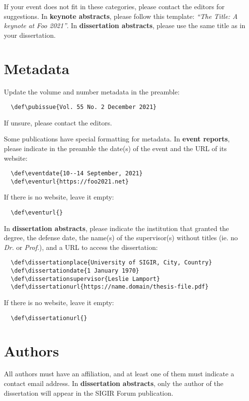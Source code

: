 \documentclass[news]{sigirforum}
\def\pubissue{December 2021}
\begin{document}
If your event does not fit in these categories, please contact the editors for suggestions. In \textbf{keynote abstracts}, please follow this template: \textsl{``The Title: A keynote at Foo 2021''}. In \textbf{dissertation abstracts}, please use the same title as in your dissertation.

\section{Metadata}

Update the volume and number metadata in the preamble:
\begin{verbatim}
  \def\pubissue{Vol. 55 No. 2 December 2021}
\end{verbatim}
If unsure, please contact the editors.

Some publications have special formatting for metadata. In \textbf{event reports}, please indicate in the preamble the date(s) of the event and the URL of its website:
\begin{verbatim}
  \def\eventdate{10--14 September, 2021}
  \def\eventurl{https://foo2021.net}
\end{verbatim}
If there is no website, leave it empty:
\begin{verbatim}
  \def\eventurl{}
\end{verbatim}

In \textbf{dissertation abstracts}, please indicate the institution that granted the degree, the defense date, the name(s) of the supervisor(s) without titles (ie. no \textsl{Dr.} or \textsl{Prof.}), and a URL to access the dissertation:
\begin{verbatim}
  \def\dissertationplace{University of SIGIR, City, Country}
  \def\dissertationdate{1 January 1970}
  \def\dissertationsupervisor{Leslie Lamport}
  \def\dissertationurl{https://name.domain/thesis-file.pdf}
\end{verbatim}
If there is no website, leave it empty:
\begin{verbatim}
  \def\dissertationurl{}
\end{verbatim}

\section{Authors}

All authors must have an affiliation, and at least one of them must indicate a contact email address. In \textbf{dissertation abstracts}, only the author of the dissertation will appear in the SIGIR Forum publication.
\end{document}
